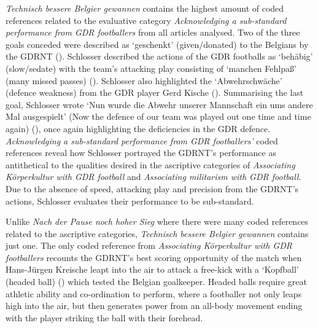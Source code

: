 \textit{Technisch bessere Belgier gewannen} contains the highest amount of coded references related to the evaluative category \textit{Acknowledging a sub-standard performance from GDR footballers} from all articles analysed. Two of the three goals conceded were described as ‘geschenkt’ (given/donated) to the Belgians by the GDRNT (\cite{nd19730419}). Schlosser described the actions of the GDR footballs as ‘behäbig’ (slow/sedate) with the team’s attacking play consisting of ‘manchen Fehlpaß’ (many missed passes) (\cite{nd19730419}). Schlosser also highlighted the ‘Abwehrschwäche’ (defence weakness) from the GDR player Gerd Kische (\cite{nd19730419}). Summarising the last goal, Schlosser wrote ‘Nun wurde die Abwehr unserer Mannschaft ein ums andere Mal ausgespielt’ (Now the defence of our team was played out one time and time again) (\cite{nd19730419}), once again highlighting the deficiencies in the GDR defence. \textit{Acknowledging a sub-standard performance from GDR footballers’} coded references reveal how Schlosser portrayed the GDRNT’s performance as antithetical to the qualities desired in the ascriptive categories of \textit{Associating Körperkultur with GDR football} and \textit{Associating militarism with GDR football}. Due to the absence of speed, attacking play and precision from the GDRNT’s actions, Schlosser evaluates their performance to be sub-standard.

Unlike \textit{Nach der Pause noch hoher Sieg} where there were many coded references related to the ascriptive categories, \textit{Technisch bessere Belgier gewannen} contains just one. The only coded reference from \textit{Associating Körperkultur with GDR footballers} recounts the GDRNT’s best scoring opportunity of the match when Hans-Jürgen Kreische leapt into the air to attack a free-kick with a ‘Kopfball’ (headed ball) (\cite{nd19730419}) which tested the Belgian goalkeeper. Headed balls require great athletic ability and co-ordination to perform, where a footballer not only leaps high into the air, but then generates power from an all-body movement ending with the player striking the ball with their forehead.

